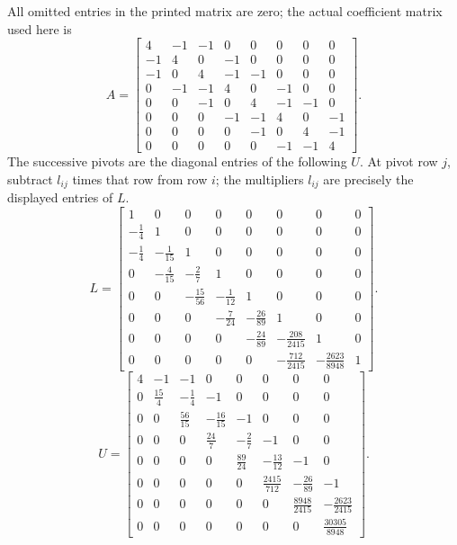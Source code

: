 All omitted entries in the printed matrix are zero; the actual
coefficient matrix used here is
\[A=\left[\begin{matrix}4 & -1 & -1 & 0 & 0 & 0 & 0 & 0\\-1 & 4 & 0 & -1 & 0 & 0 & 0 & 0\\-1 & 0 & 4 & -1 & -1 & 0 & 0 & 0\\0 & -1 & -1 & 4 & 0 & -1 & 0 & 0\\0 & 0 & -1 & 0 & 4 & -1 & -1 & 0\\0 & 0 & 0 & -1 & -1 & 4 & 0 & -1\\0 & 0 & 0 & 0 & -1 & 0 & 4 & -1\\0 & 0 & 0 & 0 & 0 & -1 & -1 & 4\end{matrix}\right].\]
The successive pivots are the diagonal entries of the following $U$.
At pivot row $j$, subtract $l_{ij}$ times that row from row $i$;
the multipliers $l_{ij}$ are precisely the displayed entries of $L$.
\[L=\left[\begin{matrix}1 & 0 & 0 & 0 & 0 & 0 & 0 & 0\\- \frac{1}{4} & 1 & 0 & 0 & 0 & 0 & 0 & 0\\- \frac{1}{4} & - \frac{1}{15} & 1 & 0 & 0 & 0 & 0 & 0\\0 & - \frac{4}{15} & - \frac{2}{7} & 1 & 0 & 0 & 0 & 0\\0 & 0 & - \frac{15}{56} & - \frac{1}{12} & 1 & 0 & 0 & 0\\0 & 0 & 0 & - \frac{7}{24} & - \frac{26}{89} & 1 & 0 & 0\\0 & 0 & 0 & 0 & - \frac{24}{89} & - \frac{208}{2415} & 1 & 0\\0 & 0 & 0 & 0 & 0 & - \frac{712}{2415} & - \frac{2623}{8948} & 1\end{matrix}\right].\]
\[U=\left[\begin{matrix}4 & -1 & -1 & 0 & 0 & 0 & 0 & 0\\0 & \frac{15}{4} & - \frac{1}{4} & -1 & 0 & 0 & 0 & 0\\0 & 0 & \frac{56}{15} & - \frac{16}{15} & -1 & 0 & 0 & 0\\0 & 0 & 0 & \frac{24}{7} & - \frac{2}{7} & -1 & 0 & 0\\0 & 0 & 0 & 0 & \frac{89}{24} & - \frac{13}{12} & -1 & 0\\0 & 0 & 0 & 0 & 0 & \frac{2415}{712} & - \frac{26}{89} & -1\\0 & 0 & 0 & 0 & 0 & 0 & \frac{8948}{2415} & - \frac{2623}{2415}\\0 & 0 & 0 & 0 & 0 & 0 & 0 & \frac{30305}{8948}\end{matrix}\right].\]
